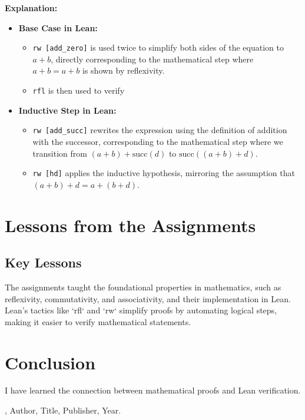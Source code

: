 \documentclass{article}
\theoremstyle{theorem}
\theoremstyle{definition}
\theoremstyle{remark}
\begin{document}
\textbf{Explanation:}

\begin{itemize}
  \item \textbf{Base Case in Lean:}
  \begin{itemize}
      \item \texttt{rw [add\_zero]} is used twice to simplify both sides of the equation to $a + b$, directly corresponding to the mathematical step where $a + b = a + b$ is shown by reflexivity.
      \item \texttt{rfl} is then used to verify
  \end{itemize}

  \item \textbf{Inductive Step in Lean:}
  \begin{itemize}
      \item \texttt{rw [add\_succ]} rewrites the expression using the definition of addition with the successor, corresponding to the mathematical step where we transition from $(a + b) + \text{succ}(d)$ to $\text{succ}((a + b) + d)$.
      \item \texttt{rw [hd]} applies the inductive hypothesis, mirroring the assumption that $(a + b) + d = a + (b + d)$.
  \end{itemize}
\end{itemize}


\section{Lessons from the Assignments}

\subsection{Key Lessons}

The assignments taught the foundational properties in mathematics, such as reflexivity, commutativity, and associativity, and their implementation in Lean. Lean's tactics like `rfl` and `rw` simplify proofs by automating logical steps, making it easier to verify mathematical statements. 

\section{Conclusion}\label{conclusion}

I have learned the connection between mathematical proofs and Lean verification. 

\begin{thebibliography}{99}
\bibitem[BLA], Author, Title, Publisher, Year.
\end{thebibliography}
\end{document}
